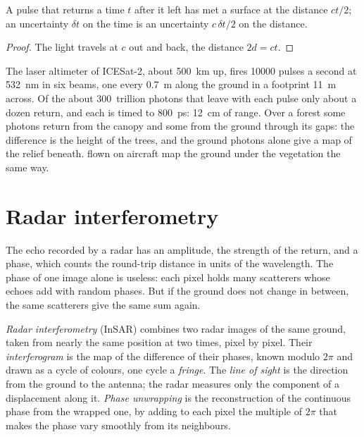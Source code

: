 \begin{proposition}\label{prop:b3:remote-sensing-gis:tof}
A pulse that returns a time $t$ after it left has met a surface at the
distance $ct/2$; an uncertainty $\delta t$ on the time is an uncertainty
$c\,\delta t/2$ on the distance.
\end{proposition}

\begin{proof}
The light travels at $c$ out and back, the distance $2d = ct$.
\end{proof}

The laser altimeter of ICESat-2, about \qty{500}{km} up, fires
\num{10000} pulses a second at \qty{532}{nm} in six beams, one every
\qty{0.7}{m} along the ground in a footprint \qty{11}{m} across. Of the
about 300~trillion photons that leave with each pulse only about a dozen
return, and each is timed to \qty{800}{ps}: \qty{12}{cm} of range. Over a
forest some photons return from the canopy and some from the ground
through its gaps: the difference is the height of the trees, and the
ground photons alone give a map of the relief beneath.  flown on
aircraft map the ground under the vegetation the same way.

\section{Radar interferometry}\label{sec:b3:remote-sensing-gis:insar}

The echo recorded by a radar has an amplitude, the strength of the return,
and a phase, which counts the round-trip distance in units of the
wavelength. The phase of one image alone is useless: each pixel holds many
scatterers whose echoes add with random phases. But if the ground does not
change in between, the same scatterers give the same sum again.

\begin{definition}\label{def:b3:remote-sensing-gis:insar}
\emph{Radar interferometry} (InSAR) combines
two radar images of the same ground, taken from nearly the same position
at two times, pixel by pixel. Their \emph{interferogram}
is the map of the difference of their phases, known modulo $2\pi$ and
drawn as a cycle of colours, one cycle a \emph{fringe}. The \emph{line of
sight} is the direction from the ground to
the antenna; the radar measures only the component of a displacement along
it. \emph{Phase unwrapping} is the reconstruction
of the continuous phase from the wrapped one, by adding to each pixel the
multiple of $2\pi$ that makes the phase vary smoothly from its neighbours.
\end{definition}

